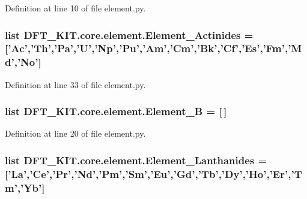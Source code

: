 Definition at line 10 of file element.\+py.

\hypertarget{namespace_d_f_t___k_i_t_1_1core_1_1element_ade7e546518077bee096b5ffb78f7181d}{
\subsubsection[{Element\+\_\+\+Actinides}]{\setlength{\rightskip}{0pt plus 5cm}list D\+F\+T\+\_\+\+K\+I\+T.\+core.\+element.\+Element\+\_\+\+Actinides = \mbox{[}'Ac','Th','Pa','U','Np','Pu','Am','Cm','Bk','Cf','Es','Fm','Md','No'\mbox{]}}}\label{namespace_d_f_t___k_i_t_1_1core_1_1element_ade7e546518077bee096b5ffb78f7181d}


Definition at line 33 of file element.\+py.

\hypertarget{namespace_d_f_t___k_i_t_1_1core_1_1element_a6cb2038aec2c22410672ead088bf4a95}{
\subsubsection[{Element\+\_\+\+B}]{\setlength{\rightskip}{0pt plus 5cm}list D\+F\+T\+\_\+\+K\+I\+T.\+core.\+element.\+Element\+\_\+\+B = \mbox{[}$\,$\mbox{]}}}\label{namespace_d_f_t___k_i_t_1_1core_1_1element_a6cb2038aec2c22410672ead088bf4a95}


Definition at line 20 of file element.\+py.

\hypertarget{namespace_d_f_t___k_i_t_1_1core_1_1element_a5185db281673b6298c79c39a681d92a9}{
\subsubsection[{Element\+\_\+\+Lanthanides}]{\setlength{\rightskip}{0pt plus 5cm}list D\+F\+T\+\_\+\+K\+I\+T.\+core.\+element.\+Element\+\_\+\+Lanthanides = \mbox{[}'La','Ce','Pr','Nd','Pm','Sm','Eu','Gd','Tb','Dy','Ho','Er','Tm','Yb'\mbox{]}}}\label{namespace_d_f_t___k_i_t_1_1core_1_1element_a5185db281673b6298c79c39a681d92a9}


